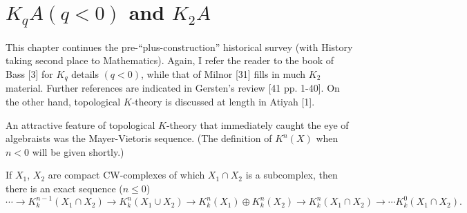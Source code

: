 \chapter{$K_qA (q<0)$ and $K_2A$}
\label{cha:3k_qa_and_k2a}
This chapter continues the pre-``plus-construction'' historical survey (with History taking second place to Mathematics). Again, I refer the reader to the book of Bass [3] for $K_q$ details $(q<0)$, while that of Milnor [31] fills in much $K_2$ material. Further references are indicated in Gersten's review [41 pp. 1-40]. On the other hand, topological $K$-theory is discussed at length in Atiyah [1].

An attractive feature of topological $K$-theory that immediately caught the eye of algebraists was the Mayer-Vietoris sequence. (The definition of $K^n(X)$ when $n < 0$ will be given shortly.)

\begin{theorem}
If $X_1$, $X_2$ are compact CW-complexes of which $X_1 \cap X_2$ is a subcomplex, then there is an exact sequence ($n \leqslant 0$)
\[ \cdots \longrightarrow K_k^{n-1}(X_1\cap X_2)\longrightarrow  K^n_k(X_1\cup X_2) \longrightarrow K_k^n(X_1) \oplus K_k^n(X_2)\longrightarrow K_k^n(X_1\cap X_2) \longrightarrow \cdots K_k^0(X_1\cap X_2).\]
\end{theorem}

